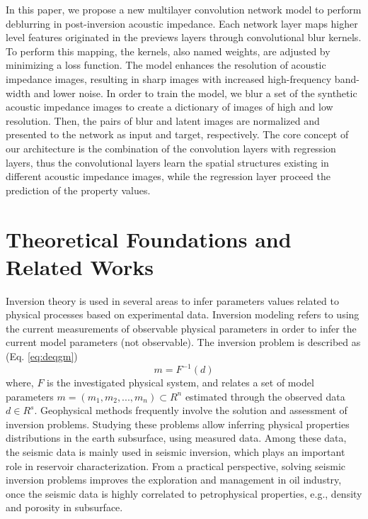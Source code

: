 \documentclass[conference,compsoc]{IEEEtran}
\begin{document}
In this paper, we propose a new multilayer convolution network model to perform deblurring in post-inversion acoustic impedance.
Each network layer maps higher level features originated in the previews layers through convolutional blur kernels.
To perform this mapping, the kernels, also named weights, are adjusted by minimizing a loss function. 
The model enhances the resolution of acoustic impedance images, resulting in sharp images with
increased high-frequency band-width and lower noise. 
In order to train the model, we blur a set of the synthetic acoustic impedance images to create a dictionary of
images of high and low resolution. Then, the pairs of blur and latent images are normalized and 
presented to the network as input and target, respectively.
The core concept of our architecture is the combination of the convolution layers with regression
layers, thus the convolutional layers learn the spatial structures existing in different
acoustic impedance images, while the regression layer proceed the prediction of the property values.
 

\section{Theoretical Foundations and Related Works}
Inversion theory is used in several areas to infer parameters values
related to physical processes based on experimental data.
Inversion modeling refers to using the current measurements of observable
physical parameters in order to infer the current model parameters (not observable).
The inversion problem is described as (Eq. \ref{eq:deqgm})
\begin{equation}
\label{eq:deqgm}
m = F^{-1}(d)
\end{equation}
where, $F$ is the investigated physical system, and relates a set of model parameters
$m=(m_1, m_2,...,m_n)\subset R^n$ estimated through the observed data $d \in R^s$.
Geophysical methods frequently involve the solution and assessment of inversion problems.
Studying these problems allow inferring physical properties distributions in the earth subsurface, using measured
data. Among these data, the seismic data is mainly used in seismic inversion, which plays an important role in
reservoir characterization. From a practical perspective, solving seismic inversion problems improves
the exploration and management in oil industry, once the seismic data is highly correlated to petrophysical
properties, e.g., density and porosity in subsurface.
\end{document}
